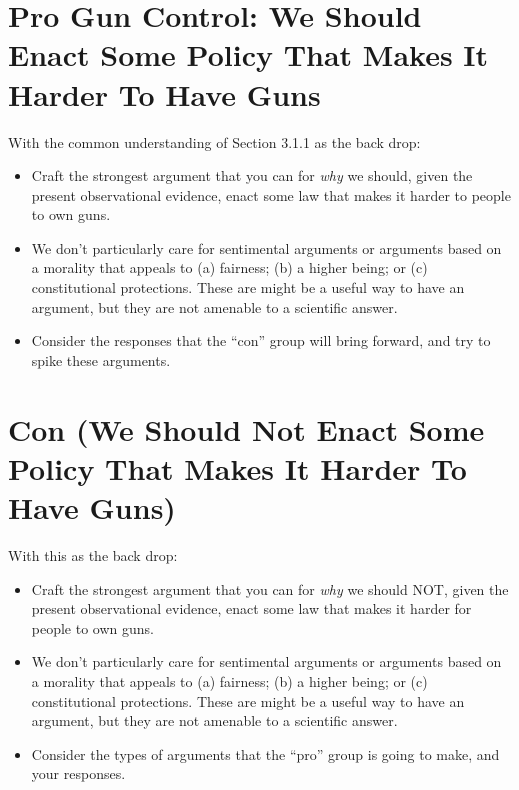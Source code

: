 \documentclass{article}
\begin{document}
\section{Pro Gun Control: We Should Enact Some Policy That Makes It Harder To Have Guns}
\label{sec:org956b39a}
With the common understanding of Section 3.1.1 as the back drop:
\begin{itemize}
\item Craft the strongest argument that you can for \emph{why} we should, given the present observational evidence, enact some law that makes it harder to people to own guns.
\item We don't particularly care for sentimental arguments or arguments based on a morality that appeals to (a) fairness; (b) a higher being; or (c) constitutional protections. These are might be a useful way to have an argument, but they are not amenable to a scientific answer.
\item Consider the responses that the ``con'' group will bring forward, and try to spike these arguments.
\end{itemize}

\section{Con (We Should Not Enact Some Policy That Makes It Harder To Have Guns)}
\label{sec:org6fb06c1}
With this as the back drop: 
\begin{itemize}
\item Craft the strongest argument that you can for \emph{why} we should NOT, given the present observational evidence, enact some law that makes it harder for people to own guns.
\item We don't particularly care for sentimental arguments or arguments based on a morality that appeals to (a) fairness; (b) a higher being; or (c) constitutional protections. These are might be a useful way to have an argument, but they are not amenable to a scientific answer.
\item Consider the types of arguments that the ``pro'' group is going to make, and your responses.
\end{itemize}
\end{document}
